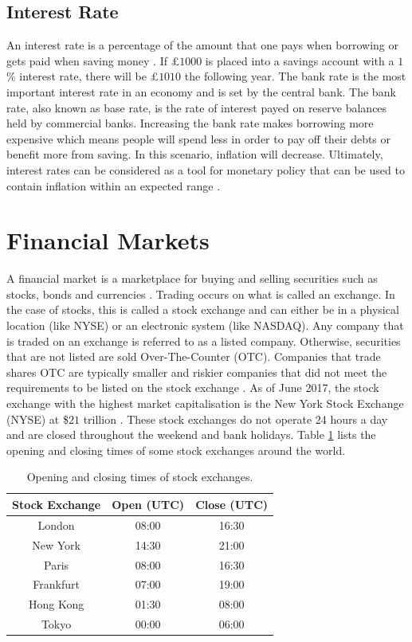 \documentclass{UoYCSproject}
\begin{document}
\subsection{Interest Rate}
An interest rate is a percentage of the amount that one pays when borrowing or gets paid when saving money \cite{interestrate}. If \pounds $1000$ is placed into a savings account with a $1$\% interest rate, there will be \pounds $1010$ the following year.  The bank rate is the most important interest rate in an economy and is set by the central bank. The bank rate, also known as base rate, is the rate of interest payed on reserve balances held by commercial banks. Increasing the bank rate makes borrowing more expensive which means people will spend less in order to pay off their debts or benefit more from saving. In this scenario, inflation will decrease. Ultimately, interest rates can be considered as a tool for monetary policy that can be used to contain inflation within an expected range \cite{christiano1999monetary}. 

\section{Financial Markets}
\label{financialmarkets}
A financial market is a marketplace for buying and selling securities such as stocks, bonds and currencies \cite{financialmarket}. Trading occurs on what is called an exchange. In the case of stocks, this is called a stock exchange and can either be in a physical location (like NYSE) or an electronic system (like NASDAQ). Any company that is traded on an exchange is referred to as a listed company. Otherwise, securities that are not listed are sold Over-The-Counter (OTC). Companies that trade shares OTC are typically smaller and riskier companies that did not meet the requirements to be listed on the stock exchange \cite{stockexchange}. As of June 2017, the stock exchange with the highest market capitalisation is the New York Stock Exchange (NYSE) at \$$21$ trillion \cite{nyse}. 
These stock exchanges do not operate 24 hours a day and are closed throughout the weekend and bank holidays. Table \ref{tab:markets} lists the opening and closing times of some stock exchanges around the world. 

\begin{table}[h]
    \centering
    \begin{tabular}{|c|c|c|} \hline
        \textbf{Stock Exchange} & \textbf{Open (UTC)} & \textbf{Close (UTC)} \\ \hline
        London & 08:00 & 16:30 \\
        New York & 14:30 & 21:00 \\
        Paris & 08:00 & 16:30 \\
        Frankfurt & 07:00 & 19:00 \\
        Hong Kong & 01:30 & 08:00 \\
        Tokyo & 00:00 & 06:00 \\
        \hline
    \end{tabular}
    \caption{Opening and closing times of stock exchanges.}
    \label{tab:markets}
\end{table}
\end{document}
